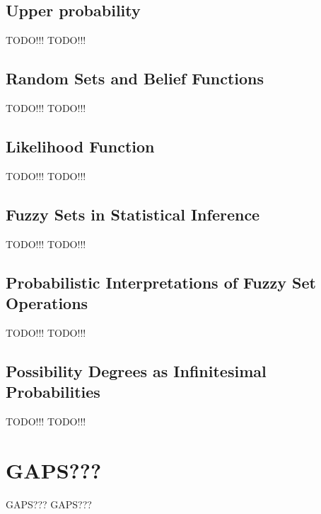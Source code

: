 \documentclass[9pt]{beamer}
\begin{document}
        \subsection{Upper probability}
            \begin{frame}{TODO!!!}
              TODO!!!
            \end{frame}
    
        \subsection{Random Sets and Belief Functions}
            \begin{frame}{TODO!!!}
              TODO!!!
            \end{frame}
            
        \subsection{Likelihood Function}
            \begin{frame}{TODO!!!}
              TODO!!!
            \end{frame}
            
        \subsection{Fuzzy Sets in Statistical Inference}
            \begin{frame}{TODO!!!}
              TODO!!!
            \end{frame}
            
        \subsection{Probabilistic Interpretations of Fuzzy Set Operations}
            \begin{frame}{TODO!!!}
              TODO!!!
            \end{frame}
            
        \subsection{Possibility Degrees as Infinitesimal Probabilities}
            \begin{frame}{TODO!!!}
              TODO!!!
            \end{frame}
            
    \section{GAPS???}
    
        \begin{frame}{GAPS???}
          GAPS???
        \end{frame}
\end{document}
